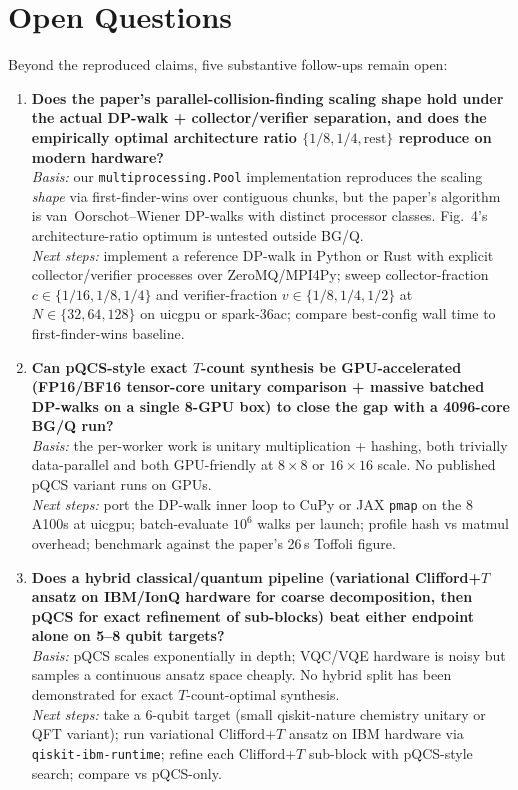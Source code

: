 \section{Open Questions}
Beyond the reproduced claims, five substantive follow-ups remain open:

\begin{enumerate}
\item \textbf{Does the paper's parallel-collision-finding scaling shape
hold under the actual DP-walk + collector/verifier separation, and does
the empirically optimal architecture ratio $\{1/8, 1/4, \text{rest}\}$
reproduce on modern hardware?}\\
\emph{Basis:} our \texttt{multiprocessing.Pool} implementation
reproduces the scaling \emph{shape} via first-finder-wins over
contiguous chunks, but the paper's algorithm is
van~Oorschot--Wiener DP-walks with distinct processor classes.
Fig.~4's architecture-ratio optimum is untested outside BG/Q.\\
\emph{Next steps:} implement a reference DP-walk in Python or Rust with
explicit collector/verifier processes over ZeroMQ/MPI4Py; sweep
collector-fraction $c\in\{1/16,1/8,1/4\}$ and verifier-fraction
$v\in\{1/8,1/4,1/2\}$ at $N\in\{32,64,128\}$ on uicgpu or spark-36ac;
compare best-config wall time to first-finder-wins baseline.

\item \textbf{Can pQCS-style exact $T$-count synthesis be
GPU-accelerated (FP16/BF16 tensor-core unitary comparison + massive
batched DP-walks on a single 8-GPU box) to close the gap with a
4096-core BG/Q run?}\\
\emph{Basis:} the per-worker work is unitary multiplication + hashing,
both trivially data-parallel and both GPU-friendly at $8{\times}8$ or
$16{\times}16$ scale. No published pQCS variant runs on GPUs.\\
\emph{Next steps:} port the DP-walk inner loop to CuPy or JAX \texttt{pmap}
on the 8 A100s at uicgpu; batch-evaluate $10^6$ walks per launch;
profile hash vs matmul overhead; benchmark against the paper's 26\,s
Toffoli figure.

\item \textbf{Does a hybrid classical/quantum pipeline (variational
Clifford+$T$ ansatz on IBM/IonQ hardware for coarse decomposition, then
pQCS for exact refinement of sub-blocks) beat either endpoint alone on
5--8 qubit targets?}\\
\emph{Basis:} pQCS scales exponentially in depth; VQC/VQE hardware is
noisy but samples a continuous ansatz space cheaply. No hybrid split has
been demonstrated for exact $T$-count-optimal synthesis.\\
\emph{Next steps:} take a 6-qubit target (small qiskit-nature chemistry
unitary or QFT variant); run variational Clifford+$T$ ansatz on IBM
hardware via \texttt{qiskit-ibm-runtime}; refine each Clifford+$T$
sub-block with pQCS-style search; compare vs pQCS-only.


\end{enumerate}
